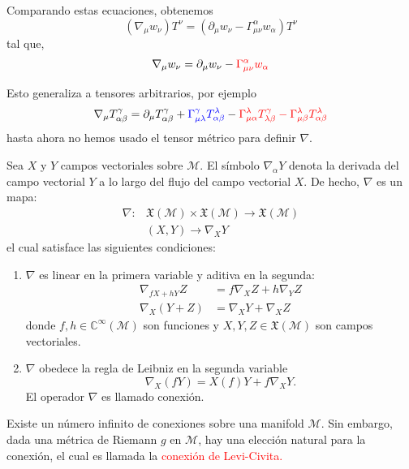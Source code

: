 \documentclass[../main]{subfiles}
\begin{document}
Comparando estas ecuaciones, obtenemos
\begin{equation}
    (\nabla_{\mu} w_{\nu})T^{\nu}=(\partial_{\mu} w_{\nu}-\Gamma^{\alpha}_{\mu\nu}w_{\alpha})T^{\nu}
\end{equation}
tal que,
\begin{equation}
    \nabla_{\mu} w_{\nu}=\partial_{\mu} w_{\nu}-\textcolor{red}{\Gamma^{\alpha}_{\mu\nu}w_{\alpha}}
\end{equation}

Esto generaliza a tensores arbitrarios, por ejemplo 
\begin{equation}
    \nabla_{\mu} T^{\gamma}_{\alpha\beta}=\partial_{\mu} T_{\alpha\beta}^{\gamma}+\textcolor{blue}{\Gamma^{\gamma}_{\mu\lambda} T^{\lambda}_{\alpha\beta}}-\textcolor{red}{\Gamma^{\lambda}_{\mu\alpha}T^{\gamma}_{\lambda\beta}-\Gamma^{\lambda}_{\mu\beta}T^{\lambda}_{\alpha\beta}}
\end{equation}
hasta ahora no hemos usado el tensor métrico para definir $\nabla$.

 Sea $X$ y $Y$ campos vectoriales sobre $\mathcal{M}$. El símbolo $\nabla_{\alpha} Y$ denota la derivada del campo vectorial $Y$ a lo largo del flujo del campo vectorial $X$. De hecho, $\nabla$ es un mapa:
\begin{equation}
    \begin{split}
        \nabla: &\mathfrak{X}(\mathcal{M}) \times \mathfrak{X}(\mathcal{M}) \rightarrow \mathfrak{X}(\mathcal{M})\\
        &(X, Y) \rightarrow \nabla_X Y
    \end{split}
\end{equation}
el cual satisface las siguientes condiciones:
\begin{enumerate}
    \item $\nabla$ es linear en la primera variable y aditiva en la segunda:
    \begin{align}
        \nabla_{fX+hY}Z&=f\nabla_X Z+h\nabla_Y Z\\
        \nabla_X (Y+Z)&=\nabla_X Y+\nabla_X Z
    \end{align}
    donde $f, h\in \mathbb{C}^{\infty}(\mathcal{M})$ son funciones y $X, Y, Z \in \mathfrak{X}(\mathcal{M})$ son campos vectoriales.
    \item $\nabla$ obedece la regla de Leibniz en la segunda variable 
    \begin{equation}
        \nabla_X (fY)=X(f)Y+f\nabla_X Y.
    \end{equation}
    El operador $\nabla$ es llamado conexión.
\end{enumerate}
Existe un número infinito de conexiones sobre una manifold $\mathcal{M}$. Sin embargo, dada una métrica de Riemann $g$ en $\mathcal{M}$, hay una elección natural para la conexión, el cual es llamada la \textcolor{red}{conexión de Levi-Civita.}
\end{document}
